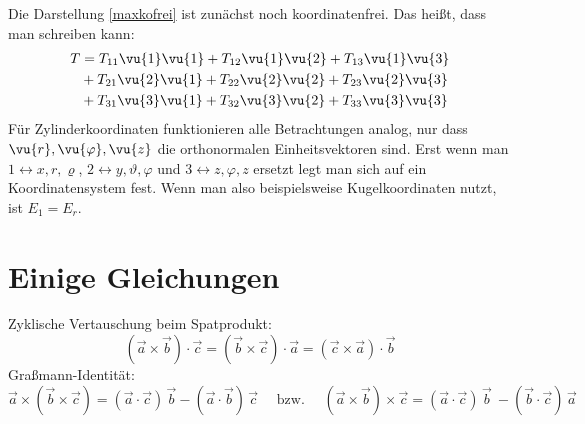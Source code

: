 	Die Darstellung \ref{maxkofrei} ist zunächst noch koordinatenfrei. Das heißt, dass man schreiben kann:
	\begin{equation}\label{maxkofreiaus}\begin{split}
			T &= T_{11} \vu{1}\vu{1} + T_{12} \vu{1}\vu{2} + T_{13} \vu{1}\vu{3} \\
			&+ T_{21} \vu{2}\vu{1} + T_{22} \vu{2}\vu{2} + T_{23} \vu{2}\vu{3} \\
			&+ T_{31} \vu{3}\vu{1} + T_{32} \vu{3}\vu{2} + T_{33} \vu{3}\vu{3} \\
	\end{split}\end{equation}
	Für Zylinderkoordinaten funktionieren alle Betrachtungen analog, nur dass $\vu{r},\vu{\varphi},\vu{z}$ die orthonormalen Einheitsvektoren sind. Erst wenn man $1\leftrightarrow x,r,\varrho$, $2\leftrightarrow y,\vartheta,\varphi$ und $3\leftrightarrow z,\varphi,z$ ersetzt legt man sich auf ein Koordinatensystem fest. Wenn man also beispielsweise Kugelkoordinaten nutzt, ist $E_1=E_r$.
\section{Einige Gleichungen}
Zyklische Vertauschung beim Spatprodukt:
\begin{equation}
	(\vec{a} \times \vec{b}) \cdot \vec{c} = (\vec{b} \times \vec{c}) \cdot \vec{a} = (\vec{c} \times \vec{a}) \cdot \vec{b}
\end{equation}
Graßmann-Identität:
\begin{equation}\label{grass}
	\vec{a}\times(\vec{b}\times\vec{c}) = (\vec{a} \cdot \vec{c}) \,\vec{b} - (\vec{a} \cdot \vec{b})\, \vec{c}  \quad \text{ bzw. } \quad (\vec{a}\times\vec{b})\times \vec{c} =  (\vec{a} \cdot \vec{c})\, \vec{b}\ - (\vec{b} \cdot \vec{c}) \,\vec{a}
\end{equation}
	

